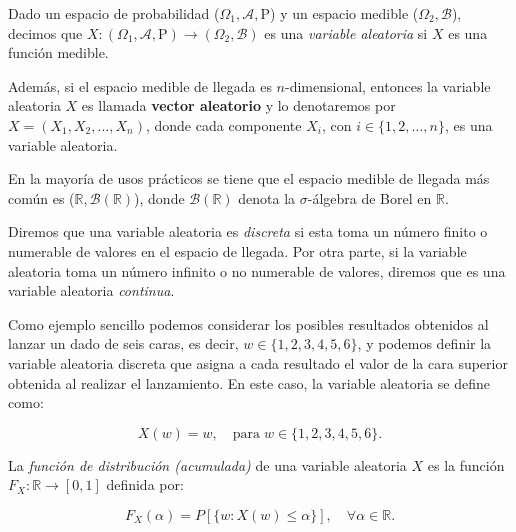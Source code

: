 \begin{definicion}\label{def:variable-aleatoria}
    Dado un espacio de probabilidad ($\Omega_1, \mathcal{A}, \mathrm{P}$) y un espacio medible ($\Omega_2, \mathcal{B}$), decimos que $X: (\Omega_1, \mathcal{A}, \mathrm{P}) \to (\Omega_2, \mathcal{B})$ es una \emph{variable aleatoria} si $X$ es una función medible.
\end{definicion}

Además, si el espacio medible de llegada es $n$-dimensional, entonces la variable aleatoria $X$ es llamada \textbf{vector aleatorio} y lo denotaremos por $X = (X_1, X_2, \ldots, X_n)$, donde cada componente $X_i$, con $i \in \{1, 2, \ldots, n\}$, es una variable aleatoria.

\begin{observacion}
    En la mayoría de usos prácticos se tiene que el espacio medible de llegada más común es ($\mathbb{R}, \mathcal{B}(\mathbb{R})$), donde $\mathcal{B}(\mathbb{R})$ denota la $\sigma$-álgebra de Borel en $\mathbb{R}$.
\end{observacion}

\begin{definicion}
    Diremos que una variable aleatoria es \emph{discreta} si esta toma un número finito o numerable de valores en el espacio de llegada. Por otra parte, si la variable aleatoria toma un número infinito o no numerable de valores, diremos que es una variable aleatoria \emph{continua}.
\end{definicion}

\begin{ejemplo}
    Como ejemplo sencillo podemos considerar los posibles resultados obtenidos al lanzar un dado de seis caras, es decir, $w \in \{1,2,3,4,5,6\}$, y podemos definir la variable aleatoria discreta que asigna a cada resultado el valor de la cara superior obtenida al realizar el lanzamiento. En este caso, la variable aleatoria se define como:

    \[ X(w) = w, \quad \text{para} \; w \in \{1,2,3,4,5,6\}. \]
\end{ejemplo}

\begin{definicion}\label{def:funcion-de-distribucion}
    La \emph{función de distribución (acumulada)} de una variable aleatoria $X$ es la función $F_X: \mathbb{R} \to [0,1]$ definida por:

    \[ F_X(\alpha) = P[\{ w:X(w) \le \alpha\}], \quad \forall \alpha \in \mathbb{R}. \]
\end{definicion}


